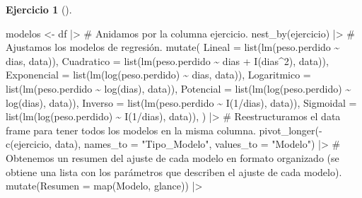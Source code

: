 \documentclass[
  a4paper,
]{scrreport}
\newenvironment{Shaded}{\begin{snugshade}}{\end{snugshade}}
\newcommand{\AttributeTok}[1]{\textcolor[rgb]{0.40,0.45,0.13}{#1}}
\newcommand{\CommentTok}[1]{\textcolor[rgb]{0.37,0.37,0.37}{#1}}
\newcommand{\DecValTok}[1]{\textcolor[rgb]{0.68,0.00,0.00}{#1}}
\newcommand{\FunctionTok}[1]{\textcolor[rgb]{0.28,0.35,0.67}{#1}}
\newcommand{\NormalTok}[1]{\textcolor[rgb]{0.00,0.23,0.31}{#1}}
\newcommand{\OtherTok}[1]{\textcolor[rgb]{0.00,0.23,0.31}{#1}}
\newcommand{\SpecialCharTok}[1]{\textcolor[rgb]{0.37,0.37,0.37}{#1}}
\newcommand{\StringTok}[1]{\textcolor[rgb]{0.13,0.47,0.30}{#1}}
\theoremstyle{definition}
\newtheorem{exercise}{Ejercicio}[chapter]
\theoremstyle{remark}
\begin{document}
\begin{exercise}[]
\begin{enumerate}
\begin{tcolorbox}
\begin{Shaded}
\begin{Highlighting}[]
\NormalTok{modelos }\OtherTok{\textless{}{-}}\NormalTok{ df  }\SpecialCharTok{|\textgreater{}} 
    \CommentTok{\# Anidamos por la columna ejercicio.}
    \FunctionTok{nest\_by}\NormalTok{(ejercicio)  }\SpecialCharTok{|\textgreater{}} 
    \CommentTok{\# Ajustamos los modelos de regresión.}
    \FunctionTok{mutate}\NormalTok{(}
        \AttributeTok{Lineal =} \FunctionTok{list}\NormalTok{(}\FunctionTok{lm}\NormalTok{(peso.perdido }\SpecialCharTok{\textasciitilde{}}\NormalTok{ dias, data)),}
        \AttributeTok{Cuadratico =} \FunctionTok{list}\NormalTok{(}\FunctionTok{lm}\NormalTok{(peso.perdido }\SpecialCharTok{\textasciitilde{}}\NormalTok{ dias }\SpecialCharTok{+} \FunctionTok{I}\NormalTok{(dias}\SpecialCharTok{\^{}}\DecValTok{2}\NormalTok{), data)),}
        \AttributeTok{Exponencial =} \FunctionTok{list}\NormalTok{(}\FunctionTok{lm}\NormalTok{(}\FunctionTok{log}\NormalTok{(peso.perdido) }\SpecialCharTok{\textasciitilde{}}\NormalTok{ dias, data)),}
        \AttributeTok{Logaritmico =} \FunctionTok{list}\NormalTok{(}\FunctionTok{lm}\NormalTok{(peso.perdido }\SpecialCharTok{\textasciitilde{}} \FunctionTok{log}\NormalTok{(dias), data)),}
        \AttributeTok{Potencial =} \FunctionTok{list}\NormalTok{(}\FunctionTok{lm}\NormalTok{(}\FunctionTok{log}\NormalTok{(peso.perdido) }\SpecialCharTok{\textasciitilde{}} \FunctionTok{log}\NormalTok{(dias), data)),}
        \AttributeTok{Inverso =} \FunctionTok{list}\NormalTok{(}\FunctionTok{lm}\NormalTok{(peso.perdido }\SpecialCharTok{\textasciitilde{}} \FunctionTok{I}\NormalTok{(}\DecValTok{1}\SpecialCharTok{/}\NormalTok{dias), data)),}
        \AttributeTok{Sigmoidal =} \FunctionTok{list}\NormalTok{(}\FunctionTok{lm}\NormalTok{(}\FunctionTok{log}\NormalTok{(peso.perdido) }\SpecialCharTok{\textasciitilde{}} \FunctionTok{I}\NormalTok{(}\DecValTok{1}\SpecialCharTok{/}\NormalTok{dias), data)),}
\NormalTok{    )  }\SpecialCharTok{|\textgreater{}} 
    \CommentTok{\# Reestructuramos el data frame para tener todos los modelos en la misma columna.}
    \FunctionTok{pivot\_longer}\NormalTok{(}\SpecialCharTok{{-}}\FunctionTok{c}\NormalTok{(ejercicio, data), }\AttributeTok{names\_to =} \StringTok{"Tipo\_Modelo"}\NormalTok{, }\AttributeTok{values\_to =} \StringTok{"Modelo"}\NormalTok{)  }\SpecialCharTok{|\textgreater{}} 
    \CommentTok{\# Obtenemos un resumen del ajuste de cada modelo en formato organizado (se obtiene una lista con los parámetros que describen el ajuste de cada modelo).}
    \FunctionTok{mutate}\NormalTok{(}\AttributeTok{Resumen =} \FunctionTok{map}\NormalTok{(Modelo, glance)) }\SpecialCharTok{|\textgreater{}} 

\end{Highlighting}
\end{Shaded}
\end{tcolorbox}
\end{enumerate}
\end{exercise}
\end{document}
